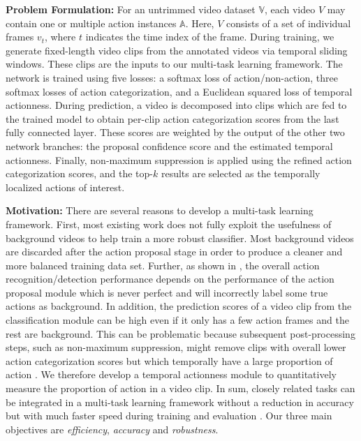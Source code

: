 \documentclass[10pt,twocolumn,letterpaper]{article}
\begin{document}
\noindent \textbf{Problem Formulation:} 
For an untrimmed video dataset $\mathbb{V}$, each video $V$ may contain one or multiple action instances $\mathbb{A}$. 
Here, $V$ consists of a set of individual frames $v_{t}$, where $t$ indicates the time index of the frame. 
During training, we generate fixed-length video clips from the annotated videos via temporal sliding windows. These clips are the inputs to our multi-task learning framework. 
The network is trained using five losses: a softmax loss of action/non-action, three softmax losses of action categorization, and a Euclidean squared loss of temporal actionness. 
During prediction, a video is decomposed into clips which are fed to the trained model to obtain per-clip action categorization scores from the last fully connected layer.  These scores are weighted by the output of the other two network branches: the proposal confidence score and the estimated temporal actionness. Finally, non-maximum suppression is applied using the refined action categorization scores, and the top-$k$ results are selected as the temporally localized actions of interest.

\noindent \textbf{Motivation:} 
There are several reasons to develop a multi-task learning framework. First, most existing work does not fully exploit the usefulness of background videos to help train a more robust classifier. Most background videos are discarded after the action proposal stage in order to produce a cleaner and more balanced training data set. Further, as shown in \cite{non_action_wang_cvpr16}, the overall action recognition/detection performance depends on the performance of the action proposal module which is never perfect and will incorrectly label some true actions as background. 
In addition,  the prediction scores of a video clip from the classification module can be high even if it only has a few action frames and the rest are background. This can be problematic because subsequent post-processing steps, such as non-maximum suppression, might remove clips with overall lower action categorization scores but which temporally have a large proportion of action \cite{scnn_shou_wang_chang_cvpr16}. 
We therefore develop a temporal actionness module to quantitatively measure the proportion of action in a video clip. 
In sum, closely related tasks can be integrated in a multi-task learning framework without a reduction in accuracy but with much faster speed during training and evaluation \cite{DAP3D2016,segment_multitask_cvpr16_dai,seq2seq_multitask_iclr16_luong,object_multitask_iccv15_ghifary}. 
Our three main objectives are \textit{efficiency}, \textit{accuracy} and \textit{robustness}.
\end{document}
